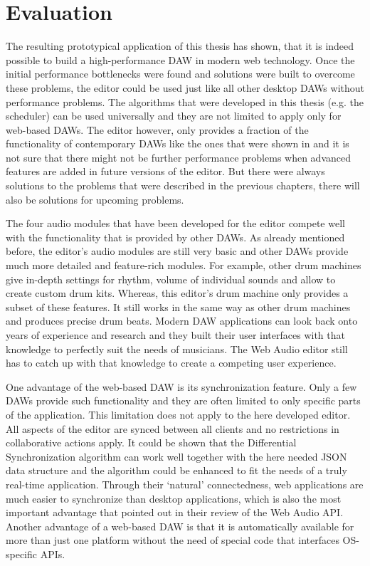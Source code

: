 \chapter{Evaluation}
\label{ch:evaluation}

The resulting prototypical application of this thesis has shown, that it is indeed possible to build a high-performance DAW in modern web technology. Once the initial performance bottlenecks were found and solutions were built to overcome these problems, the editor could be used just like all other desktop DAWs without performance problems. The algorithms that were developed in this thesis (e.g. the scheduler) can be used universally and they are not limited to apply only for web-based DAWs. The editor however, only provides a fraction of the functionality of contemporary DAWs like the ones that were shown in  and it is not sure that there might not be further performance problems when advanced features are added in future versions of the editor. But there were always solutions to the problems that were described in the previous chapters, there will also be solutions for upcoming problems.

The four audio modules that have been developed for the editor compete well with the functionality that is provided by other DAWs. As already mentioned before, the editor's audio modules are still very basic and other DAWs provide much more detailed and feature-rich modules. For example, other drum machines give in-depth settings for rhythm, volume of individual sounds and allow to create custom drum kits. Whereas, this editor's drum machine only provides a subset of these features. It still works in the same way as other drum machines and produces precise drum beats. Modern DAW applications can look back onto years of experience and research and they built their user interfaces with that knowledge to perfectly suit the needs of musicians. The Web Audio editor still has to catch up with that knowledge to create a competing user experience.

One advantage of the web-based DAW is its synchronization feature. Only a few DAWs provide such functionality and they are often limited to only specific parts of the application. This limitation does not apply to the here developed editor. All aspects of the editor are synced between all clients and no restrictions in collaborative actions apply. It could be shown that the Differential Synchronization algorithm can work well together with the here needed JSON data structure and the algorithm could be enhanced to fit the needs of a truly real-time application. Through their `natural' connectedness, web applications are much easier to synchronize than desktop applications, which is also the most important advantage that \cite[p. 21]{wyse2013viability} pointed out in their review of the Web Audio API. Another advantage of a web-based DAW is that it is automatically available for more than just one platform without the need of special code that interfaces OS-specific APIs.

